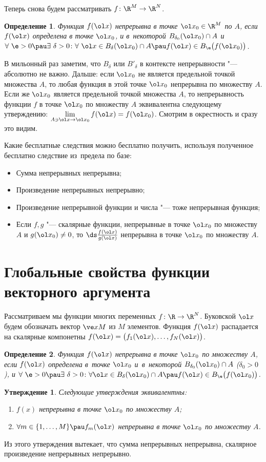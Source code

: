 \documentclass[a4paper,10pt,twoside]{article}
\newtheorem{Def}{Определение}[section]
\newtheorem{Ut}{Утверждение}[section]
\let\AVsection\section{}
\renewcommand\section{\newpage\scol\AVsection}
\newcommand{\scol}{  \renewcommand{\headrulewidth}{0.5pt}\fancyhead[RE,LO]{\thesection{} \leftmark} \fancyhead[LE,RO]{\thepage}}
\begin{document}
	 Теперь снова будем рассматривать $f\colon \R^M\to \R^N$.
	 \begin{Def}
	 Функция $f(\ol x)$ непрерывна в точке $\ol x_0\in\R^M$ по $A$, если $f(\ol x)$ определена в точке $\ol x_0$, и в~некоторой
	 $B_{\delta_0}(\ol x_0)\cap A$ и $\forall\ \e>0\pau \exists \ \delta >0\colon 
	 \forall \ \ol x\in B_\delta(\ol x_0)\cap A\pau f(\ol x)\in B_\e\big(f(\ol x_0)\big)$.  
	 \end{Def}
	 В мильонный раз заметим, что $B_\delta$ или $B'_\delta$ в контексте непрерывности "--- абсолютно не важно.
	 Дальше: если $\ol x_0$ не является предельной точкой множества $A$, то любая функция в этой точке $\ol x_0$ непрерывна по множеству $A$.
	 Если же $\ol x_0$ является предельной точкой множества $A$, то непрерывность функции $f$ в точке $\ol x_0$ по множеству $A$ эквивалентна следующему
	 утверждению: $\lim\limits_{A\ni \ol x\to \ol x_0}f(\ol x) = f(\ol x_0)$. Смотрим в окрестность и сразу это видим.
	 
	 Какие бесплатные следствия можно бесплатно получить, используя полученное бесплатно следствие из~предела по базе:
	 \begin{itemize}
	   \item Сумма непрерывных непрерывна;
	   \item Произведение непрерывных непрерывно;
	   \item Произведение непрерывной функции и числа "--- тоже непрерывная функция;
	   \item Если $f,g$ "--- скалярные функции, непрерывные в точке $\ol x_0$ по множеству $A$ и $g(\ol x_0)\neq 0$, то
	   $\ds\frac{f(\ol x)}{g(\ol x)}$ непрерывна в точке $\ol x_0$ по множеству $A$.
	 \end{itemize}
	 \section{Глобальные свойства функции векторного аргумента}
	 Рассматриваем мы функции многих переменных $f\colon \R\to \R^N$. Буковской $\ol x$ будем обозначать
	 вектор $\ve xM$ из $M$ элементов. Функция $f(\ol x)$ распадается на скалярные компонетны $f(\ol x)=\big(f_1(\ol x),\ldots,f_N(\ol x)\big)$.
	 \begin{Def}
	 Функция $f(\ol x)$ непрерывна в точке $\ol x_0$ по множеству $A$, если $f(\ol x)$ определена в~точке $\ol x_0$ и~в~некоторой
	 $B_{\delta_0}(\ol x_0)\cap A$ ($\delta_0>0$), и $\forall\ \e>0\pau \exists\ \delta>0\colon
	 \forall \ol x\in B_\delta(\ol x_0)\cap A\pau f(\ol x)\in B_\e\big(f(\ol x_0)\big)$.
	 \end{Def}
	 \begin{Ut}
	 Следующие утверждения эквивалентны:
	 \begin{enumerate}
	   \item $f(x)$ непрерывна в точке $\ol x_0$ по множеству $A$;
	   \item $\forall m\in \{1,\ldots,M\}\pau f_m(\ol x)$ непрерывна в точке $\ol x_0$ по множеству $A$.
	 \end{enumerate}
	 \end{Ut}
	 Из этого утверждения вытекает, что сумма непрерывных непрерывна, скалярное произведение непрерывных непрерывно.
	 
\end{document}

